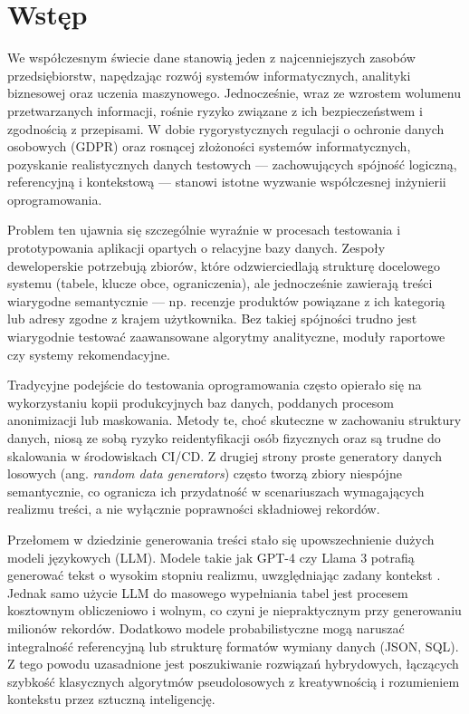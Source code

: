 \chapter{Wstęp}

We współczesnym świecie dane stanowią jeden z najcenniejszych zasobów przedsiębiorstw, napędzając rozwój systemów informatycznych, analityki biznesowej oraz uczenia maszynowego. Jednocześnie, wraz ze wzrostem wolumenu przetwarzanych informacji, rośnie ryzyko związane z ich bezpieczeństwem i zgodnością z przepisami. W dobie rygorystycznych regulacji o ochronie danych osobowych (GDPR) \cite{european_parliament_2016_679} oraz rosnącej złożoności systemów informatycznych, pozyskanie realistycznych danych testowych --- zachowujących spójność logiczną, referencyjną i kontekstową --- stanowi istotne wyzwanie współczesnej inżynierii oprogramowania.

Problem ten ujawnia się szczególnie wyraźnie w procesach testowania i prototypowania aplikacji opartych o relacyjne bazy danych. Zespoły deweloperskie potrzebują zbiorów, które odzwierciedlają strukturę docelowego systemu (tabele, klucze obce, ograniczenia), ale jednocześnie zawierają treści wiarygodne semantycznie --- np. recenzje produktów powiązane z ich kategorią lub adresy zgodne z krajem użytkownika. Bez takiej spójności trudno jest wiarygodnie testować zaawansowane algorytmy analityczne, moduły raportowe czy systemy rekomendacyjne.

Tradycyjne podejście do testowania oprogramowania często opierało się na wykorzystaniu kopii produkcyjnych baz danych, poddanych procesom anonimizacji lub maskowania. Metody te, choć skuteczne w zachowaniu struktury danych, niosą ze sobą ryzyko reidentyfikacji osób fizycznych \cite{deanonymization_risks} oraz są trudne do skalowania w środowiskach \gls{CI/CD}. Z drugiej strony proste generatory danych losowych (ang. \emph{random data generators}) często tworzą zbiory niespójne semantycznie, co ogranicza ich przydatność w scenariuszach wymagających realizmu treści, a nie wyłącznie poprawności składniowej rekordów.

Przełomem w dziedzinie generowania treści stało się upowszechnienie dużych modeli językowych (\gls{LLM}). Modele takie jak GPT-4 czy Llama 3 potrafią generować tekst o wysokim stopniu realizmu, uwzględniając zadany kontekst \cite{llm_synthetic_data}. Jednak samo użycie \gls{LLM} do masowego wypełniania tabel jest procesem kosztownym obliczeniowo i wolnym, co czyni je niepraktycznym przy generowaniu milionów rekordów. Dodatkowo modele probabilistyczne mogą naruszać integralność referencyjną lub strukturę formatów wymiany danych (\gls{JSON}, \gls{SQL}). Z tego powodu uzasadnione jest poszukiwanie rozwiązań hybrydowych, łączących szybkość klasycznych algorytmów pseudolosowych z kreatywnością i rozumieniem kontekstu przez sztuczną inteligencję.

